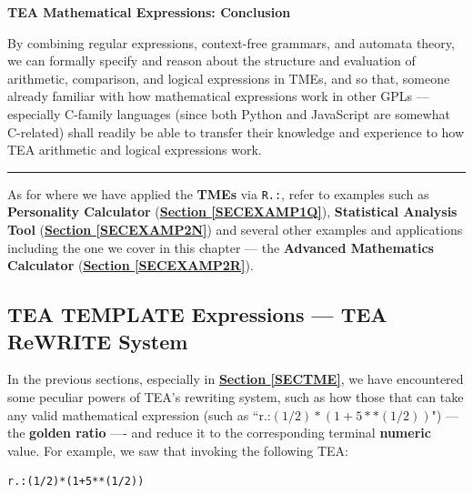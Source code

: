 \documentclass[a4paper, 18pt]{book} %
\begin{document}
{{{{\vspace{1em}

\textbf{TEA Mathematical Expressions: Conclusion}

By combining regular expressions, context-free grammars, and automata theory, we can formally specify and reason about the structure and evaluation of arithmetic, comparison, and logical expressions in TMEs, and so that, someone already familiar with how mathematical expressions work in other GPLs --- especially C-family languages (since both Python and JavaScript are somewhat C-related) shall readily be able to transfer their knowledge and experience to how TEA arithmetic and logical expressions work.

}
\noindent\rule{\textwidth}{0.4pt}

As for where we have applied the \textbf{TMEs} via \texttt{R.:}, refer to examples such as \textbf{Personality Calculator} (\textbf{\hyperref[SECEXAMP1Q]{Section \ref{SECEXAMP1Q}}}), \textbf{Statistical Analysis Tool} (\textbf{\hyperref[SECEXAMP2N]{Section \ref{SECEXAMP2N}}}) and several other examples and applications including the one we cover in this chapter --- the \textbf{Advanced Mathematics Calculator} (\textbf{\hyperref[SECEXAMP2R]{Section \ref{SECEXAMP2R}}}).

 
 \subsection{TEA TEMPLATE Expressions --- TEA ReWRITE System}
 \label{SECRTEATEMPLATES}
 

In the previous sections, especially in \textbf{\hyperref[SECTME]{Section \ref{SECTME}}}, we have encountered some peculiar powers of TEA's rewriting system, such as how those that can take any valid mathematical expression (such as ``r.:$(1/2)*(1+5**(1/2))$") --- the \textbf{golden ratio} ---- and reduce it to the corresponding terminal \textbf{numeric} value. For example, we saw that invoking the following TEA:


\vspace{1em}

  \begin{tcolorbox}[teaterminalstyle, title=R: EXAMPLE 6: Using R.:, breakable]
  \begin{lstlisting}[language=TEA,breaklines=true,]
r.:(1/2)*(1+5**(1/2))
   \end{lstlisting}
  \end{tcolorbox}

\vspace{1em}

}}}
\end{document}
